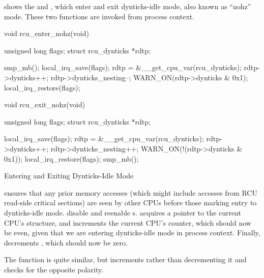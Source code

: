 shows the  and ,
which enter and exit dynticks-idle mode, also known as ``nohz'' mode.
These two functions are invoked from process context.

\begin{listing}
\begin{fcvlabel}
\begin{VerbatimL}[commandchars=\\\[\]]
void rcu_enter_nohz(void)
{
	unsigned long flags;
	struct rcu_dynticks *rdtp;

	smp_mb();			\lnlbl[mb]
	local_irq_save(flags);		\lnlbl[irq_sv]
	rdtp = &__get_cpu_var(rcu_dynticks); 
	rdtp->dynticks++;		
	rdtp->dynticks_nesting--;	
	WARN_ON(rdtp->dynticks & 0x1);
	local_irq_restore(flags);	\lnlbl[irq_rs]
}

void rcu_exit_nohz(void)
{
	unsigned long flags;
	struct rcu_dynticks *rdtp;

	local_irq_save(flags);
	rdtp = &__get_cpu_var(rcu_dynticks);
	rdtp->dynticks++;
	rdtp->dynticks_nesting++;
	WARN_ON(!(rdtp->dynticks & 0x1));
	local_irq_restore(flags);
	smp_mb();
}
\end{VerbatimL}
\end{fcvlabel}
\caption{Entering and Exiting Dynticks-Idle Mode}
\label{lst:formal:Entering and Exiting Dynticks-Idle Mode}
\end{listing}

\begin{fcvref}
 ensures that any prior memory accesses (which might
include accesses from RCU read-side critical sections) are seen
by other CPUs before those marking entry to dynticks-idle mode.
 disable and reenable \IRQ s.
 acquires a pointer to the current CPU's 
structure, and
 increments the current CPU's  counter, which
should now be even, given that we are entering dynticks-idle mode
in process context.
Finally,  decrements ,
which should now be zero.
\end{fcvref}

The  function is quite similar, but increments
 rather than decrementing it and checks for
the opposite  polarity.

